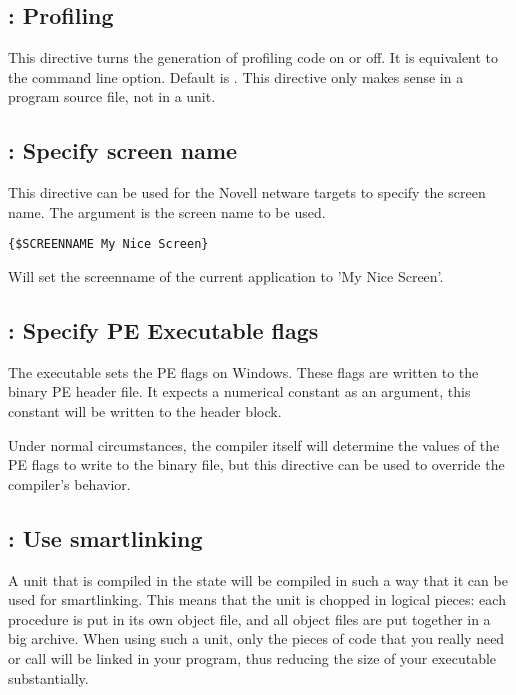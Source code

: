 \subsection{ : Profiling}

This directive turns the generation of profiling code on or off. 
It is equivalent to the  command line option. 
Default is . 
This directive only makes sense in a program source file, not in a unit.



\subsection{ : Specify screen name}
This directive can be used for the Novell netware targets to specify the screen name. 
The argument is the screen name to be used.
\begin{verbatim}
{$SCREENNAME My Nice Screen}
\end{verbatim}
Will set the screenname of the current application to 'My Nice Screen'.

\subsection{ : Specify PE Executable flags}
The  executable sets the PE flags on Windows. These 
flags are written to the binary PE header file. It expects a numerical
constant as an argument, this constant will be written to the header block.

Under normal circumstances, the compiler itself will determine the values of
the PE flags to write to the binary file, but this directive can be used to
override the compiler's behavior.
 
\subsection{ : Use smartlinking}

A unit that is compiled in the  state will be
compiled in such a way that it can be used for smartlinking. This means that
the unit is chopped in logical pieces: each procedure is put in its own
object file, and all object files are put together in a big archive. When
using such a unit, only the pieces of code that you really need or call
will be linked in your program, thus reducing the size of your executable
substantially.

